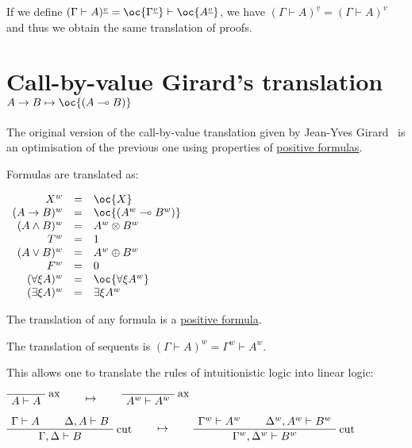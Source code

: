 If we define
\((\Gamma\vdash A)^{\underline{v}} = \oc{\Gamma^{\underline{v}}}\vdash\oc{A^{\underline{v}}}\),
we have \((\Gamma\vdash A)^{\underline{v}} = (\Gamma\vdash A)^v\) and
thus we obtain the same translation of proofs.

\section{\texorpdfstring{Call-by-value Girard's translation \(A\imp B \mapsto \oc{(A\limp B)}\)}{Call-by-value Girard's translation A\textbackslash{}imp B \textbackslash{}mapsto \textbackslash{}oc\{(A\textbackslash{}limp B)\}}}\label{call-by-value-girards-translation-aimp-b-mapsto-ocalimp-b}

The original version of the call-by-value translation given by Jean-Yves
Girard~\cite{linearlogic} is an optimisation of the previous one using
properties of \hyperref[positive-formula]{positive formulas}.

Formulas are translated as:

\(\begin{array}{rcl}
X^w &  = &  \oc{X} \\
(A\imp B)^w &  = &  \oc{(A^w\limp B^w)} \\
(A\wedge B)^w &  = &  A^w \tens B^w \\
T^w &  = &  \one \\
(A\vee B)^w &  = &  A^w\plus B^w \\
F^w &  = &  \zero \\
(\forall\xi A)^w &  = &  \oc{\forall\xi A^w} \\
(\exists\xi A)^w &  = &  \exists\xi A^w
\end{array}\)

The translation of any formula is a \hyperref[positive-formula]{positive formula}.

The translation of sequents is
\((\Gamma\vdash A)^w = \Gamma^w\vdash A^w\).

This allows one to translate the rules of intuitionistic logic into
linear logic:

\(\LabelRule{\rulename{ax}}
\NulRule{A\vdash A}
\DisplayProof
\qquad\mapsto\qquad
\LabelRule{\rulename{ax}}
\NulRule{A^w\vdash A^w}
\DisplayProof\)

\(\AxRule{\Gamma\vdash A}
\AxRule{\Delta,A\vdash B}
\LabelRule{\rulename{cut}}
\BinRule{\Gamma,\Delta\vdash B}
\DisplayProof
\qquad\mapsto\qquad
\AxRule{\Gamma^w\vdash A^w}
\AxRule{\Delta^w,A^w\vdash B^w}
\LabelRule{\rulename{cut}}
\BinRule{\Gamma^w,\Delta^w\vdash B^w}
\DisplayProof\)

